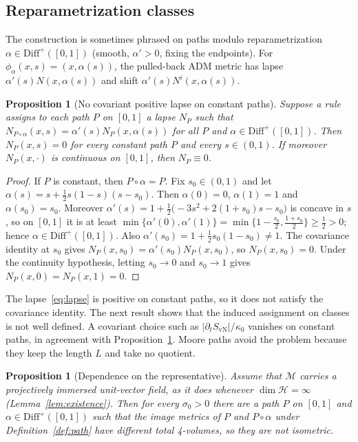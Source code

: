 \documentclass[11pt,a4paper,reqno]{amsart}
\newtheorem{proposition}[theorem]{Proposition}
\theoremstyle{definition}
\numberwithin{equation}{section}
\begin{document}
\subsection{Reparametrization classes}

The construction is sometimes phrased on paths modulo reparametrization $\alpha\in\mathrm{Diff}^+([0,1])$ (smooth, $\alpha'>0$, fixing the endpoints). For $\phi_\alpha(x,s)=(x,\alpha(s))$, the pulled-back ADM metric has lapse $\alpha'(s)N(x,\alpha(s))$ and shift $\alpha'(s)N^i(x,\alpha(s))$.

\begin{proposition}[No covariant positive lapse on constant paths]\label{prop:cov-nogo}
Suppose a rule assigns to each path $P$ on $[0,1]$ a lapse $N_P$ such that $N_{P\circ\alpha}(x,s)=\alpha'(s)N_P(x,\alpha(s))$ for all $P$ and $\alpha\in\mathrm{Diff}^+([0,1])$. Then $N_P(x,s)=0$ for every constant path $P$ and every $s\in(0,1)$. If moreover $N_P(x,\cdot)$ is continuous on $[0,1]$, then $N_P\equiv0$.
\end{proposition}

\begin{proof}
If $P$ is constant, then $P\circ\alpha=P$. Fix $s_0\in(0,1)$ and let $\alpha(s)=s+\tfrac12s(1-s)(s-s_0)$. Then $\alpha(0)=0$, $\alpha(1)=1$ and $\alpha(s_0)=s_0$. Moreover $\alpha'(s)=1+\tfrac12\big(-3s^2+2(1+s_0)s-s_0\big)$ is concave in $s$, so on $[0,1]$ it is at least $\min\{\alpha'(0),\alpha'(1)\}=\min\{1-\tfrac{s_0}{2},\tfrac{1+s_0}{2}\}\ge\tfrac12>0$; hence $\alpha\in\mathrm{Diff}^+([0,1])$. Also $\alpha'(s_0)=1+\tfrac12s_0(1-s_0)\neq1$. The covariance identity at $s_0$ gives $N_P(x,s_0)=\alpha'(s_0)N_P(x,s_0)$, so $N_P(x,s_0)=0$. Under the continuity hypothesis, letting $s_0\to0$ and $s_0\to1$ gives $N_P(x,0)=N_P(x,1)=0$.
\end{proof}

The lapse~\eqref{eq:lapse} is positive on constant paths, so it does not satisfy the covariance identity. The next result shows that the induced assignment on classes is not well defined. A covariant choice such as $|\partial_tS_{\mathrm{vN}}|/\kappa_0$ vanishes on constant paths, in agreement with Proposition~\ref{prop:cov-nogo}. Moore paths avoid the problem because they keep the length $L$ and take no quotient.

\begin{proposition}[Dependence on the representative]\label{prop:reparam}
Assume that $\mathcal{M}$ carries a projectively immersed unit-vector field, as it does whenever $\dim\mathcal{H}=\infty$ (Lemma~\ref{lem:existence}). Then for every $\sigma_0>0$ there are a path $P$ on $[0,1]$ and $\alpha\in\mathrm{Diff}^+([0,1])$ such that the image metrics of $P$ and $P\circ\alpha$ under Definition~\ref{def:path} have different total 4-volumes, so they are not isometric.
\end{proposition}
\end{document}
